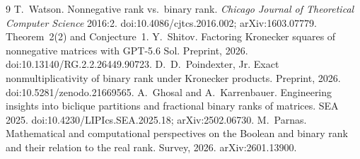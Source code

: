 \begin{thebibliography}{9}
 T.~Watson. Nonnegative rank vs.\ binary rank. \emph{Chicago Journal of Theoretical Computer Science} 2016:2. doi:10.4086/cjtcs.2016.002; arXiv:1603.07779. Theorem~2(2) and Conjecture~1.
 Y.~Shitov. Factoring Kronecker squares of nonnegative matrices with GPT-5.6 Sol. Preprint, 2026. doi:10.13140/RG.2.2.26449.90723.
 D.~D.~Poindexter, Jr. Exact nonmultiplicativity of binary rank under Kronecker products. Preprint, 2026. doi:10.5281/zenodo.21669565.
 A.~Ghosal and A.~Karrenbauer. Engineering insights into biclique partitions and fractional binary ranks of matrices. SEA 2025. doi:10.4230/LIPIcs.SEA.2025.18; arXiv:2502.06730.
 M.~Parnas. Mathematical and computational perspectives on the Boolean and binary rank and their relation to the real rank. Survey, 2026. arXiv:2601.13900.
\end{thebibliography}
